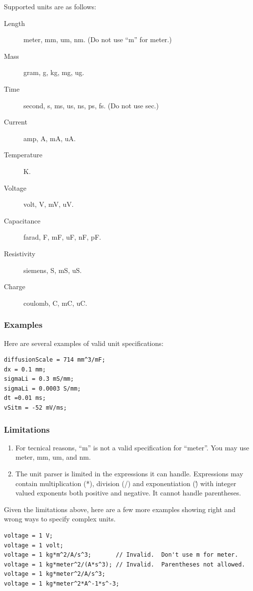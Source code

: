 \documentclass{article}
\begin{document}
Supported units are as follows:
\begin{description}
\item[Length] meter, mm, um, nm.  (Do not use ``m'' for meter.)
\item[Mass] gram, g, kg, mg, ug.
\item[Time] second, s, ms, us, ns, ps, fs.  (Do not use sec.)
\item[Current] amp, A, mA, uA.
\item[Temperature] K.
\item[Voltage] volt, V, mV, uV.
\item[Capacitance] farad, F, mF, uF, nF, pF.
\item[Resistivity] siemens, S, mS, uS.
\item[Charge] coulomb, C, mC, uC.
\end{description}


\subsubsection{Examples}

Here are several examples of valid unit specifications:

\begin{verbatim}
diffusionScale = 714 mm^3/mF;
dx = 0.1 mm;
sigmaLi = 0.3 mS/mm;
sigmaLi = 0.0003 S/mm;
dt =0.01 ms;
vSitm = -52 mV/ms;
\end{verbatim}

\subsubsection{Limitations}

\begin{enumerate}
\item For tecnical reasons, ``m'' is not a valid specification for
  ``meter''.  You may use meter, mm, um, and nm.
  \item The unit parser is limited in the expressions it can handle.
    Expressions may contain multiplication (*), division (/) and
    exponentiation (\^) with integer valued exponents both positive and
    negative.  It cannot handle parentheses.  
\end{enumerate}

Given the limitations above, here are a few more examples showing right
and wrong ways to specify complex units.
\begin{verbatim}
voltage = 1 V;
voltage = 1 volt;
voltage = 1 kg*m^2/A/s^3;       // Invalid.  Don't use m for meter.
voltage = 1 kg*meter^2/(A*s^3); // Invalid.  Parentheses not allowed.
voltage = 1 kg*meter^2/A/s^3;
voltage = 1 kg*meter^2*A^-1*s^-3;
\end{verbatim}
\end{document}
